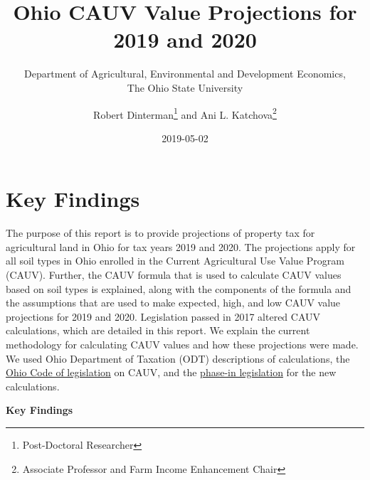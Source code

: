 \documentclass[]{article}
\title{Ohio CAUV Value Projections for 2019 and 2020}
\subtitle{Department of Agricultural, Environmental and Development Economics,\\
The Ohio State University}
\author{Robert Dinterman\footnote{Post-Doctoral Researcher} and Ani L.
Katchova\footnote{Associate Professor and Farm Income Enhancement Chair}}
\date{2019-05-02}
\begin{document}
\maketitle

\hypertarget{key-findings}{%
\section{Key Findings}\label{key-findings}}

The purpose of this report is to provide projections of property tax for
agricultural land in Ohio for tax years 2019 and 2020. The projections
apply for all soil types in Ohio enrolled in the Current Agricultural
Use Value Program (CAUV). Further, the CAUV formula that is used to
calculate CAUV values based on soil types is explained, along with the
components of the formula and the assumptions that are used to make
expected, high, and low CAUV value projections for 2019 and 2020.
Legislation passed in 2017 altered CAUV calculations, which are detailed
in this report. We explain the current methodology for calculating CAUV
values and how these projections were made. We used Ohio Department of
Taxation (ODT) descriptions of calculations, the
\href{http://codes.ohio.gov/orc/5713.31}{Ohio Code of legislation} on
CAUV, and the \href{http://codes.ohio.gov/orc/5715.01}{phase-in
legislation} for the new calculations.

\textbf{Key Findings}
\end{document}
